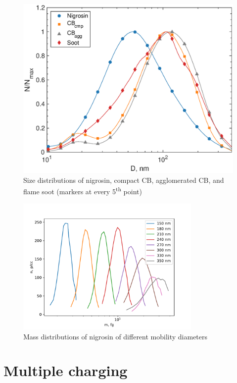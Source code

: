 \documentclass[12pt]{article}
\begin{document}
\begin{figure}[htp]
\centering
\includegraphics[scale=0.7]{fig_supp_smps.eps}
\caption{Size distributions of nigrosin, compact CB, agglomerated CB, and flame soot (markers at every 5\textsuperscript{th} point)}
\label{s:fig:smps}
\end{figure}

\begin{figure}[htp]
    \centering
    \includegraphics[width=0.8\textwidth]{apm-bare-nigrosin.pdf}
    \caption{Mass distributions of nigrosin of different mobility diameters}
    \label{s:fig:apm-bare-nigrosin}
\end{figure}

\section{Multiple charging}
\end{document}
